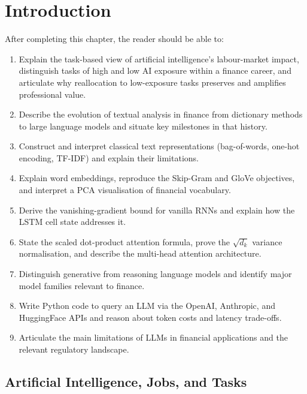 ﻿\chapter{Introduction}
\label{ch:intro}

\begin{remark}
After completing this chapter, the reader should be able to:
\begin{enumerate}
  \item Explain the task-based view of artificial intelligence's labour-market
        impact, distinguish tasks of high and low AI exposure within a finance
        career, and articulate why reallocation to low-exposure tasks preserves
        and amplifies professional value.
  \item Describe the evolution of textual analysis in finance from dictionary methods
        to large language models and situate key milestones in that history.
  \item Construct and interpret classical text representations (bag-of-words, one-hot
        encoding, TF-IDF) and explain their limitations.
  \item Explain word embeddings, reproduce the Skip-Gram and GloVe objectives, and
        interpret a PCA visualisation of financial vocabulary.
  \item Derive the vanishing-gradient bound for vanilla RNNs and explain how the LSTM
        cell state addresses it.
  \item State the scaled dot-product attention formula, prove the $\sqrt{d_k}$ variance
        normalisation, and describe the multi-head attention architecture.
  \item Distinguish generative from reasoning language models and identify major model
        families relevant to finance.
  \item Write Python code to query an LLM via the OpenAI, Anthropic, and HuggingFace
        APIs and reason about token costs and latency trade-offs.
  \item Articulate the main limitations of LLMs in financial applications and the
        relevant regulatory landscape.
\end{enumerate}
\end{remark}

\section{Artificial Intelligence, Jobs, and Tasks}
\label{sec:ai-jobs-tasks}

